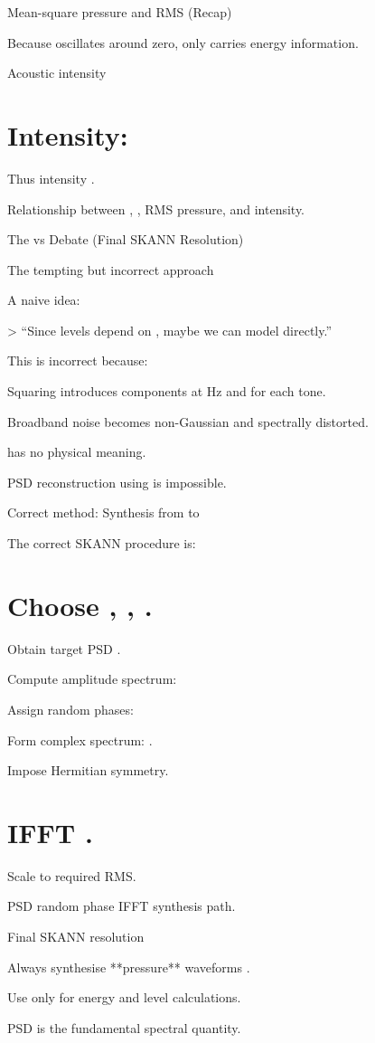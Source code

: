 \documentclass[12pt]{article}
\begin{document}
Mean-square pressure and RMS (Recap)


Because  oscillates around zero, only  carries energy information.

Acoustic intensity

\section*{Intensity:}

Thus intensity .

Relationship between , , RMS pressure, and intensity.

The  vs  Debate (Final SKANN Resolution)

The tempting but incorrect approach

A naive idea:

> “Since levels depend on , maybe we can model  directly.”

This is incorrect because:

Squaring introduces components at  Hz and  for each tone.

Broadband noise becomes non-Gaussian and spectrally distorted.

has no physical meaning.

PSD reconstruction using  is impossible.

Correct method: Synthesis from  to

The correct SKANN procedure is:

\section*{Choose , , .}
Obtain target PSD .

Compute amplitude spectrum:


Assign random phases:


Form complex spectrum: .

Impose Hermitian symmetry.

\section*{IFFT  .}
Scale to required RMS.

PSD   random phase  IFFT   synthesis path.

Final SKANN resolution

Always synthesise **pressure** waveforms .

Use  only for energy and level calculations.

PSD is the fundamental spectral quantity.
\end{document}
